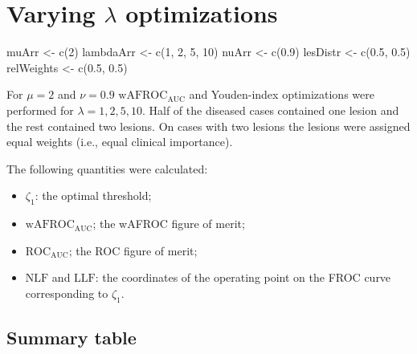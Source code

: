 \documentclass[
]{book}
\newenvironment{Shaded}{\begin{snugshade}}{\end{snugshade}}
\newcommand{\DecValTok}[1]{\textcolor[rgb]{0.00,0.00,0.81}{#1}}
\newcommand{\FloatTok}[1]{\textcolor[rgb]{0.00,0.00,0.81}{#1}}
\newcommand{\FunctionTok}[1]{\textcolor[rgb]{0.00,0.00,0.00}{#1}}
\newcommand{\NormalTok}[1]{#1}
\newcommand{\OtherTok}[1]{\textcolor[rgb]{0.56,0.35,0.01}{#1}}
\begin{document}
\hypertarget{optim-op-point-vary-lambda}{%
\section{\texorpdfstring{Varying \(\lambda\) optimizations}{Varying \textbackslash lambda optimizations}}\label{optim-op-point-vary-lambda}}

\begin{Shaded}
\begin{Highlighting}[]
\NormalTok{muArr }\OtherTok{\textless{}{-}} \FunctionTok{c}\NormalTok{(}\DecValTok{2}\NormalTok{)}
\NormalTok{lambdaArr }\OtherTok{\textless{}{-}} \FunctionTok{c}\NormalTok{(}\DecValTok{1}\NormalTok{, }\DecValTok{2}\NormalTok{, }\DecValTok{5}\NormalTok{, }\DecValTok{10}\NormalTok{)}
\NormalTok{nuArr }\OtherTok{\textless{}{-}} \FunctionTok{c}\NormalTok{(}\FloatTok{0.9}\NormalTok{)}
\NormalTok{lesDistr }\OtherTok{\textless{}{-}} \FunctionTok{c}\NormalTok{(}\FloatTok{0.5}\NormalTok{, }\FloatTok{0.5}\NormalTok{)}
\NormalTok{relWeights }\OtherTok{\textless{}{-}} \FunctionTok{c}\NormalTok{(}\FloatTok{0.5}\NormalTok{, }\FloatTok{0.5}\NormalTok{)}
\end{Highlighting}
\end{Shaded}

For \(\mu = 2\) and \(\nu = 0.9\) \(\text{wAFROC}_\text{AUC}\) and Youden-index optimizations were performed for \(\lambda = 1, 2, 5, 10\). Half of the diseased cases contained one lesion and the rest contained two lesions. On cases with two lesions the lesions were assigned equal weights (i.e., equal clinical importance).

The following quantities were calculated:

\begin{itemize}
\item
  \(\zeta_1\): the optimal threshold;
\item
  \(\text{wAFROC}_\text{AUC}\); the wAFROC figure of merit;
\item
  \(\text{ROC}_\text{AUC}\); the ROC figure of merit;
\item
  \(\text{NLF}\) and \(\text{LLF}\): the coordinates of the operating point on the FROC curve corresponding to \(\zeta_1\).
\end{itemize}

\hypertarget{summary-table}{%
\subsection{Summary table}\label{summary-table}}
\end{document}

